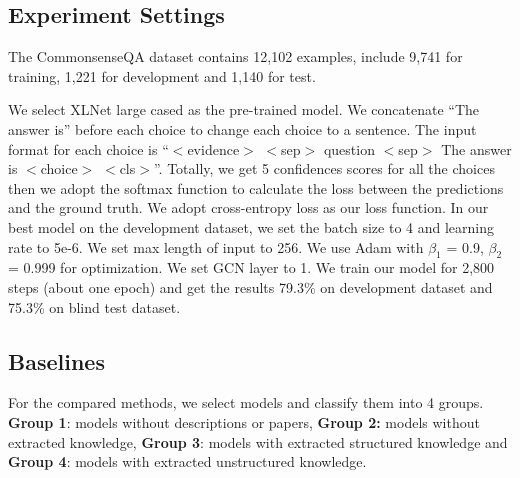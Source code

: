 \documentclass[letterpaper]{article} \usepackage{aaai20}  \usepackage{times}  \usepackage{helvet} \usepackage{courier}  \usepackage[hyphens]{url}  \usepackage{graphicx} \urlstyle{rm} \def\UrlFont{\rm}  \usepackage{graphicx}  \frenchspacing  \setlength{\pdfpagewidth}{8.5in}  \setlength{\pdfpageheight}{11in}
\begin{document}
\subsection{Experiment Settings}
The CommonsenseQA \cite{talmor2019commonsenseqa} dataset contains 12,102 examples, include 9,741 for training, 1,221 for development and 1,140 for test. 

 We select XLNet large cased \cite{xlnet2019yang} as the pre-trained model. We concatenate ``The answer is'' before each choice to change each choice to a sentence. The input format for each choice is ``$<$evidence$>$ $<$sep$>$ question $<$sep$>$ The answer is $<$choice$>$ $<$cls$>$''. Totally, we get 5 confidences scores for all the choices then we adopt the softmax function to calculate the loss between the predictions and the ground truth. We adopt cross-entropy loss as our loss function. In our best model on the development dataset, we set the batch size to 4 and learning rate to 5e-6. We set max length of input to 256. We use Adam  \cite{kingma2014adam} with $\beta_1$ = 0.9, $\beta_2$ = 0.999 for optimization. We set GCN layer to 1. We train our model for 2,800 steps (about one epoch) and get the results 79.3\% on development dataset and 75.3\% on blind test dataset.
 
 \subsection{Baselines}

For the compared methods, we select models and classify them into 4 groups. \textbf{Group 1}: models without descriptions or papers, \textbf{Group 2:} models without extracted knowledge, \textbf{Group 3}: models with extracted structured knowledge and \textbf{Group 4}: models with extracted unstructured knowledge.
\end{document}
